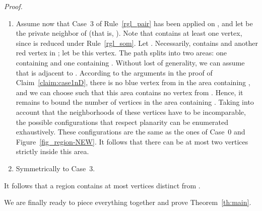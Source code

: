 \documentclass[a4paper,11pt]{article}
\newtheorem{claimN} {Claim}
\newcommand{\rrgl}   [1] {Rule~\ref{#1}\xspace}
\newenvironment{proof}{\noindent \textit{Proof. }}{\hfill\vspace{.2cm}}
\begin{document}
\begin{proof}
\begin{enumerate}
    \begin{claimN}\label{claim:case2D}
There are at most 2 blue vertices in .
    \end{claimN}

    \begin{proof} As each vertex  has incomparable neighborhood with  and , necessarily  contains , a red vertex in , and another in . Note that in each of the two areas described above, there is an unique vertex of each type, hence there is a unique vertex from , in each of the two areas.
    \end{proof}

\item
Assume now that Case~3 of \rrgl{rgl_pair}  has been applied on , and let  be the private neighbor of  (that is, ).
Note that  contains at least one vertex, since  is reduced under \rrgl{rgl_som}. Let .
Necessarily,  contains  and another red vertex in ; let  be this vertex. The path  splits  into two areas: one containing  and one containing . Without lost of generality, we can assume that  is adjacent to . According to the arguments in the proof of Claim~\ref{claim:case1nD}, there is no blue vertex from  in the area containing , and we can choose  such that this area contains no vertex from . Hence, it remains to bound the number of vertices in the area containing . Taking into account that the neighborhoods of these vertices have to be incomparable, the possible configurations that respect planarity can be enumerated exhaustively. These configurations are the same as the ones of Case~0 and Figure~\ref{fig_region-NEW}. It follows that there can be at most two vertices strictly inside this area.

\item
Symmetrically to Case~3.

\end{enumerate}

It follows that a region contains at most  vertices distinct from .


\vspace{-.5cm}
\end{proof}

\vspace{.65cm}

We are finally ready to piece everything together and prove Theorem~\ref{th:main}.

\vspace{.35cm}
\end{document}

